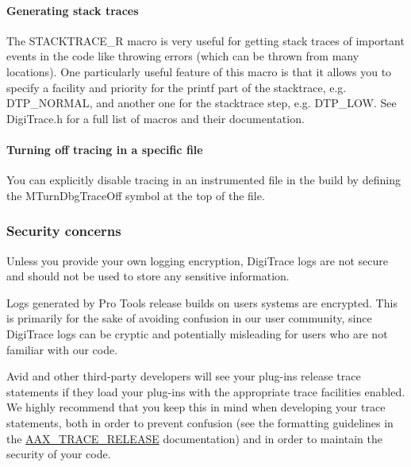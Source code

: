 \hypertarget{a00364_digitrace__advancedlogging__stacktrace}{}\paragraph{Generating stack traces}\label{a00364_digitrace__advancedlogging__stacktrace}
 The {\ttfamily S\+T\+A\+C\+K\+T\+R\+A\+C\+E\+\_\+\+R} macro is very useful for getting stack traces of important events in the code like throwing errors (which can be thrown from many locations). One particularly useful feature of this macro is that it allows you to specify a facility and priority for the printf part of the stacktrace, e.\+g. {\ttfamily D\+T\+P\+\_\+\+N\+O\+R\+M\+A\+L}, and another one for the stacktrace step, e.\+g. {\ttfamily D\+T\+P\+\_\+\+L\+O\+W}. See Digi\+Trace.\+h for a full list of macros and their documentation.

\hypertarget{a00364_digitrace__advancedlogging__disabletracing}{}\paragraph{Turning off tracing in a specific file}\label{a00364_digitrace__advancedlogging__disabletracing}
 You can explicitly disable tracing in an instrumented file in the build by defining the {\ttfamily M\+Turn\+Dbg\+Trace\+Off} symbol at the top of the file.

\hypertarget{a00364_digitrace__tracingfromplugins__security}{}\subsubsection{Security concerns}\label{a00364_digitrace__tracingfromplugins__security}
 Unless you provide your own logging encryption, Digi\+Trace logs are not secure and should not be used to store any sensitive information.

 Logs generated by Pro Tools release builds on users\textquotesingle{} systems are encrypted. This is primarily for the sake of avoiding confusion in our user community, since Digi\+Trace logs can be cryptic and potentially misleading for users who are not familiar with our code.

 Avid and other third-\/party developers will see your plug-\/ins\textquotesingle{} release trace statements if they load your plug-\/ins with the appropriate trace facilities enabled. We highly recommend that you keep this in mind when developing your trace statements, both in order to prevent confusion (see the formatting guidelines in the \hyperlink{a00158_ac2aa820ece56bb59140ad561218db4b3}{A\+A\+X\+\_\+\+T\+R\+A\+C\+E\+\_\+\+R\+E\+L\+E\+A\+S\+E} documentation) and in order to maintain the security of your code.



